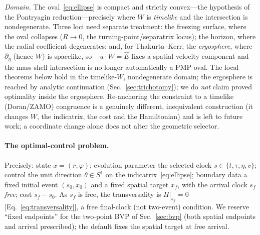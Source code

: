\documentclass[
    aps, prd, twocolumn, superscriptaddress,
    showpacs, nofootinbib, floatfix
]{revtex4-2}
\newcommand{\Ehat}{\hat E}
\begin{document}
\emph{Domain.} The oval~\eqref{eq:ellipse} is compact and strictly convex---the
hypothesis of the Pontryagin reduction---precisely where $W$ is \emph{timelike} and
the intersection is nondegenerate. Three loci need separate treatment: the freezing
surface, where the oval collapses ($R\to0$, the turning-point/separatrix locus); the
horizon, where the radial coefficient degenerates; and, for Thakurta--Kerr, the
\emph{ergosphere}, where $\partial_\eta$ (hence $W$) is spacelike, so
$-u\cdot W=\Ehat$ fixes a spatial velocity component and the mass-shell intersection
is no longer automatically a PMP oval. The local theorems below hold in the
timelike-$W$, nondegenerate domain; the ergosphere is reached by analytic
continuation (Sec.~\ref{sec:trichotomy}); we do \emph{not} claim proved optimality
inside the ergosphere. Re-anchoring the constraint to a timelike (Doran/ZAMO)
congruence is a genuinely different, inequivalent construction (it changes $W$, the
indicatrix, the cost and the Hamiltonian) and is left to future work; a coordinate
change alone does not alter the geometric selector.

\paragraph{The optimal-control problem.} Precisely: state $x=(r,\varphi)$; evolution
parameter the selected clock $s\in\{t,\tau,\eta,v\}$; control the unit direction
$\theta\in S^1$ on the indicatrix~\eqref{eq:ellipse}; boundary data a fixed initial
event $(s_0,x_0)$ and a fixed spatial target $x_f$, with the arrival clock $s_f$
\emph{free}; cost $s_f-s_0$. As $s_f$ is free, the transversality is $H|_{s_f}=0$
[Eq.~\eqref{eq:transversality}], a free final-clock (not two-event) condition. We
reserve ``fixed endpoints'' for the two-point BVP of Sec.~\ref{sec:bvp} (both spatial
endpoints and arrival prescribed); the default fixes the spatial target at free arrival.
\end{document}
